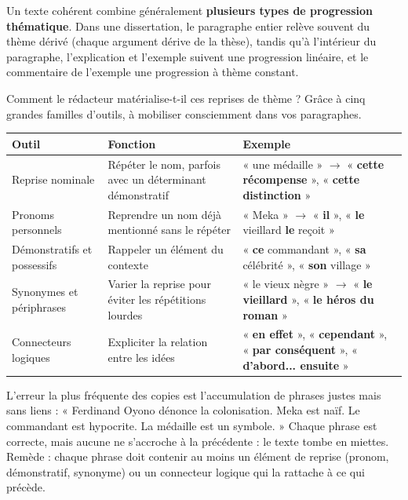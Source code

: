 \documentclass[11pt]{article}
\newcounter{popsec}
\newcounter{popsub}
\newcommand{\courssub}[1]{%
  \stepcounter{popsub}%
  \par\vspace{9pt}\noindent{\popxbold\fontsize{11.5}{13}\selectfont\color{popink}{\color{poporange}\thepopsec.\thepopsub}\hspace{6pt}#1}\par\nopagebreak\vspace{4pt}
}
\begin{document}
\begin{propriete}
Un texte cohérent combine généralement \textbf{plusieurs types de progression thématique}. Dans une dissertation, le paragraphe entier relève souvent du thème dérivé (chaque argument dérive de la thèse), tandis qu'à l'intérieur du paragraphe, l'explication et l'exemple suivent une progression linéaire, et le commentaire de l'exemple une progression à thème constant.
\end{propriete}

\courssub{Les outils de la cohésion}

Comment le rédacteur matérialise-t-il ces reprises de thème ? Grâce à cinq grandes familles d'outils, à mobiliser consciemment dans vos paragraphes.

\begin{center}
\begin{tabularx}{\linewidth}{|l|X|X|}
\hline
\rowcolor{popblueL} \textbf{Outil} & \textbf{Fonction} & \textbf{Exemple} \\
\hline
Reprise nominale & Répéter le nom, parfois avec un déterminant démonstratif & « une médaille » $\rightarrow$ « \textbf{cette récompense} », « \textbf{cette distinction} » \\
\hline
Pronoms personnels & Reprendre un nom déjà mentionné sans le répéter & « Meka » $\rightarrow$ « \textbf{il} », « \textbf{le} vieillard \textbf{le} reçoit » \\
\hline
Démonstratifs et possessifs & Rappeler un élément du contexte & « \textbf{ce} commandant », « \textbf{sa} célébrité », « \textbf{son} village » \\
\hline
Synonymes et périphrases & Varier la reprise pour éviter les répétitions lourdes & « le vieux nègre » $\rightarrow$ « \textbf{le vieillard} », « \textbf{le héros du roman} » \\
\hline
Connecteurs logiques & Expliciter la relation entre les idées & « \textbf{en effet} », « \textbf{cependant} », « \textbf{par conséquent} », « \textbf{d'abord... ensuite} » \\
\hline
\end{tabularx}
\end{center}

\begin{attention}
L'erreur la plus fréquente des copies est l'accumulation de phrases justes mais sans liens : « Ferdinand Oyono dénonce la colonisation. Meka est naïf. Le commandant est hypocrite. La médaille est un symbole. » Chaque phrase est correcte, mais aucune ne s'accroche à la précédente : le texte tombe en miettes. Remède : chaque phrase doit contenir au moins un élément de reprise (pronom, démonstratif, synonyme) ou un connecteur logique qui la rattache à ce qui précède.
\end{attention}
\end{document}
